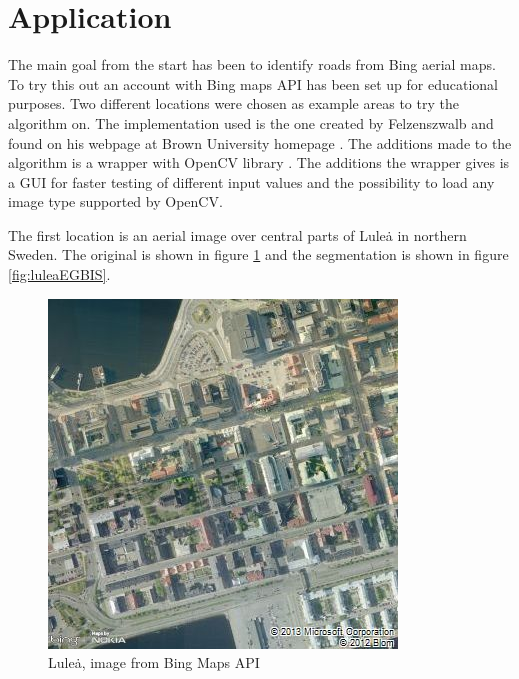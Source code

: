 \section{Application}
The main goal from the start has been to identify roads from Bing aerial maps.
To try this out an account with Bing maps API has been set up for educational
purposes. Two different locations were chosen as example areas to try the algorithm
on. The implementation used is the one created by Felzenszwalb and found on
his webpage at Brown University homepage \cite{web:sourceCode}. The additions
made to the algorithm is a wrapper with OpenCV library \cite{web:wrapper}.
The additions the wrapper gives is a GUI for faster testing of different
input values and the possibility to load any image type supported by OpenCV.

The first location is an aerial image over central parts of Lule\.{a} in northern
Sweden. The original is shown in figure \ref{fig:luleaOriginal} and the segmentation
is shown in figure \ref{fig:luleaEGBIS}.
\begin{figure}[ht]
    \begin{minipage}[t]{\linewidth}
        \centering
        \includegraphics[width=\textwidth]{images/bing/lulea-original.jpg}
        \caption{Lule\.{a}, image from Bing Maps API}
        \label{fig:luleaOriginal}
    \end{minipage}
\end{figure}
